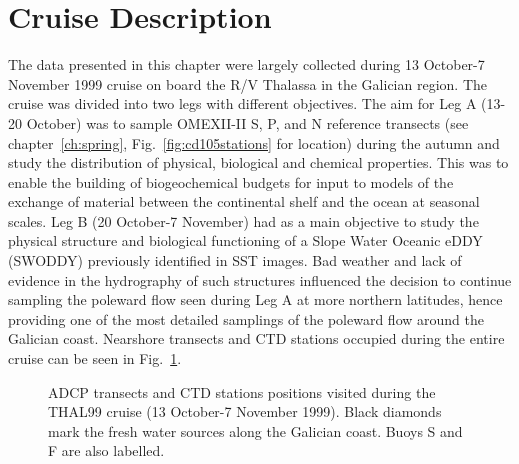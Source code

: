 \section{Cruise Description}
The data presented in this chapter were largely collected during
13 October-7 November 1999 cruise on board the R/V Thalassa in the
Galician region. The cruise was divided into two legs with
different objectives. The aim for Leg A (13-20 October) was to
sample OMEXII-II S, P, and N reference transects (see
chapter~\ref{ch:spring}, Fig.~\ref{fig:cd105stations} for
location) during the autumn and study the distribution of
physical, biological and chemical properties. This was to enable
the building of biogeochemical budgets for input to models of the
exchange of material between the continental shelf and the ocean
at seasonal scales. Leg B (20 October-7 November) had as a main
objective to study the physical structure and biological
functioning of a Slope Water Oceanic eDDY (SWODDY) previously
identified in SST images. Bad weather and lack of evidence in the
hydrography of such structures influenced the decision to continue
sampling the poleward flow seen during Leg A at more northern
latitudes, hence providing one of the most detailed samplings of
the poleward flow around the Galician coast. Nearshore transects
and CTD stations occupied during the entire cruise can be seen in
Fig.~\ref{fig:thal_adcp_st}.

\begin{figure}
\centering \arribacap
{}
 \caption{
ADCP transects and CTD stations positions visited during the
THAL99 cruise (13 October-7 November 1999). Black diamonds mark
the fresh water sources along the Galician coast. Buoys S and F
are also labelled.} \label{fig:thal_adcp_st}
\end{figure}


